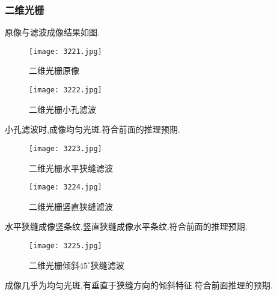 \documentclass[10pt]{ctexart}
\begin{document}
\subsubsection{二维光栅}
原像与滤波成像结果如图.
\begin{figure}[H]
\begin{minipage}[t]{0.5\linewidth}
\centering
\texttt{[image: 3221.jpg]}
\caption{二维光栅原像}
\end{minipage}
\hfill
\begin{minipage}[t]{0.5\linewidth}
\centering
\texttt{[image: 3222.jpg]}
\caption{二维光栅小孔滤波}
\end{minipage}
\end{figure}
小孔滤波时,成像均匀光斑.符合前面的推理预期.
\begin{figure}[H]
\begin{minipage}[t]{0.5\linewidth}
\centering
\texttt{[image: 3223.jpg]}
\caption{二维光栅水平狭缝滤波}
\end{minipage}
\hfill
\begin{minipage}[t]{0.5\linewidth}
\centering
\texttt{[image: 3224.jpg]}
\caption{二维光栅竖直狭缝滤波}
\end{minipage}
\end{figure}
水平狭缝成像竖条纹,竖直狭缝成像水平条纹.符合前面的推理预期.
\begin{figure}[H]
\centering
\texttt{[image: 3225.jpg]}
\caption{二维光栅倾斜$45^\circ$狭缝滤波}
\end{figure}
成像几乎为均匀光斑,有垂直于狭缝方向的倾斜特征.符合前面推理的预期.
\end{document}
